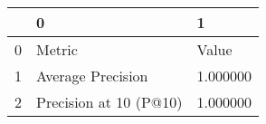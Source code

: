 \begin{tabular}{lll}
\toprule
 & 0 & 1 \\
\midrule
0 & Metric & Value \\
1 & Average Precision & 1.000000 \\
2 & Precision at 10 (P@10) & 1.000000 \\
\bottomrule
\end{tabular}
